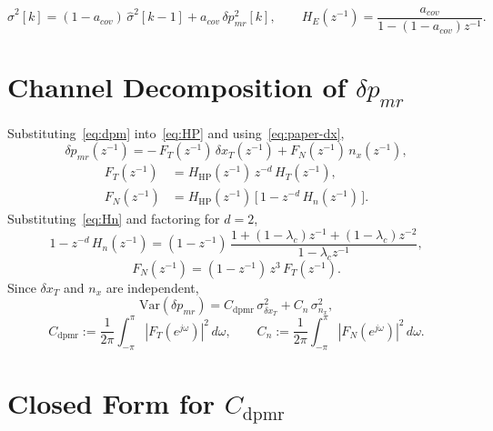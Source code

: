 \documentclass[11pt,a4paper]{ctexart}
\newcommand{\lc}{\lambda_c}
\newcommand{\dxT}{\delta x_{T}}
\newcommand{\nx}{n_{x}}
\newcommand{\dpmr}{\delta p_{mr}}
\newcommand{\HT}{H_{T}}
\newcommand{\Hn}{H_{n}}
\newcommand{\HHP}{H_{\mathrm{HP}}}
\newcommand{\HE}{H_{E}}
\newcommand{\FT}{F_{T}}
\newcommand{\FN}{F_{N}}
\newcommand{\Cdpmr}{C_{\mathrm{dpmr}}}
\newcommand{\Cn}{C_{n}}
\newcommand{\acov}{a_{cov}}
\newcommand{\sighatsq}{\hat{\sigma}^{2}}
\begin{document}
\begin{equation}
\sighatsq[k] = (1-\acov)\,\sighatsq[k-1] + \acov\,\dpmr^{2}[k],
\qquad
\HE(z^{-1}) = \frac{\acov}{1-(1-\acov)z^{-1}}.
\label{eq:EWMA}
\end{equation}

\section{Channel Decomposition of $\dpmr$}

Substituting~\eqref{eq:dpm} into~\eqref{eq:HP} and using~\eqref{eq:paper-dx},
\begin{equation}
\dpmr(z^{-1}) = -\,\FT(z^{-1})\,\dxT(z^{-1}) + \FN(z^{-1})\,\nx(z^{-1}),
\label{eq:dpmr-decomp}
\end{equation}
\begin{align}
\FT(z^{-1}) &= \HHP(z^{-1})\,z^{-d}\,\HT(z^{-1}), \label{eq:FT-def}\\[2pt]
\FN(z^{-1}) &= \HHP(z^{-1})\,\bigl[\,1 - z^{-d}\,\Hn(z^{-1})\,\bigr]. \label{eq:FN-def}
\end{align}
Substituting~\eqref{eq:Hn} and factoring for $d=2$,
\begin{equation}
1 - z^{-d}\,\Hn(z^{-1}) = (1-z^{-1})\,\frac{1+(1{-}\lc)z^{-1}+(1{-}\lc)z^{-2}}{1-\lc z^{-1}},
\label{eq:identity}
\end{equation}
\begin{equation}
\FN(z^{-1}) = (1-z^{-1})\,z^{3}\,\FT(z^{-1}).
\label{eq:FN-vs-FT}
\end{equation}
Since $\dxT$ and $\nx$ are independent,
\begin{equation}
\mathrm{Var}(\dpmr) = \Cdpmr\,\sigma^{2}_{\dxT} + \Cn\,\sigma^{2}_{\nx},
\label{eq:variance-split}
\end{equation}
\begin{equation}
\Cdpmr := \frac{1}{2\pi}\!\!\int_{-\pi}^{\pi}\!\!|\FT(e^{j\omega})|^{2}\,d\omega,
\qquad
\Cn := \frac{1}{2\pi}\!\!\int_{-\pi}^{\pi}\!\!|\FN(e^{j\omega})|^{2}\,d\omega.
\label{eq:Cdpmr-Cn-def}
\end{equation}

\section{Closed Form for $\Cdpmr$}
\end{document}
